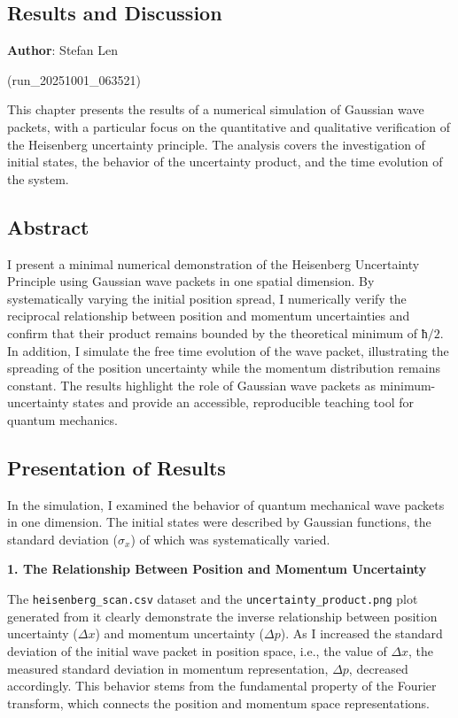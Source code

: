 \subsection{Results and Discussion}\label{results-and-discussion}

\textbf{Author}: Stefan Len

(run\_20251001\_063521)

This chapter presents the results of a numerical simulation of Gaussian
wave packets, with a particular focus on the quantitative and
qualitative verification of the Heisenberg uncertainty principle. The
analysis covers the investigation of initial states, the behavior of the
uncertainty product, and the time evolution of the system.

\subsection{Abstract}\label{abstract}

I present a minimal numerical demonstration of the Heisenberg
Uncertainty Principle using Gaussian wave packets in one spatial
dimension. By systematically varying the initial position spread, I
numerically verify the reciprocal relationship between position and
momentum uncertainties and confirm that their product remains bounded by
the theoretical minimum of \(ħ/2\). In addition, I simulate the free
time evolution of the wave packet, illustrating the spreading of the
position uncertainty while the momentum distribution remains constant.
The results highlight the role of Gaussian wave packets as
minimum-uncertainty states and provide an accessible, reproducible
teaching tool for quantum mechanics.

\subsection{Presentation of Results}\label{presentation-of-results}

In the simulation, I examined the behavior of quantum mechanical wave
packets in one dimension. The initial states were described by Gaussian
functions, the standard deviation (\(σ_x\)) of which was systematically
varied.

\textbf{1. The Relationship Between Position and Momentum Uncertainty}

The \texttt{heisenberg\_scan.csv} dataset and the
\texttt{uncertainty\_product.png} plot generated from it clearly
demonstrate the inverse relationship between position uncertainty
(\(Δx\)) and momentum uncertainty (\(Δp\)). As I increased the standard
deviation of the initial wave packet in position space, i.e., the value
of \(Δx\), the measured standard deviation in momentum representation,
\(Δp\), decreased accordingly. This behavior stems from the fundamental
property of the Fourier transform, which connects the position and
momentum space representations.

